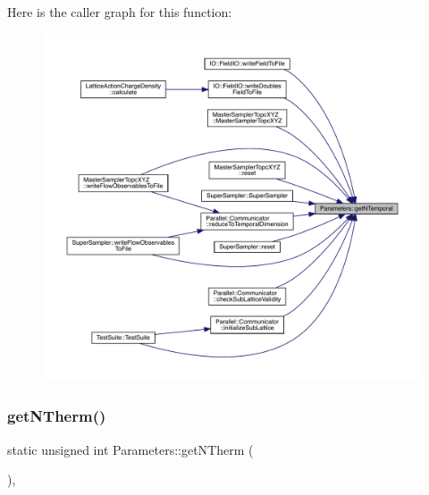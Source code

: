 Here is the caller graph for this function\+:\nopagebreak
\begin{figure}[H]
\begin{center}
\leavevmode
\includegraphics[width=350pt]{class_parameters_a237ea1286459e8c648e983464829fe8d_icgraph}
\end{center}
\end{figure}
\mbox{\label{class_parameters_ad1f56cc1bb6c19f40454b30a5bc82da6}} 
\subsubsection{\texorpdfstring{getNTherm()}{getNTherm()}}
{\footnotesize\ttfamily static unsigned int Parameters\+::get\+N\+Therm (\begin{DoxyParamCaption}{ }\end{DoxyParamCaption})\hspace{0.3cm}{\ttfamily [inline]}, {\ttfamily [static]}}

